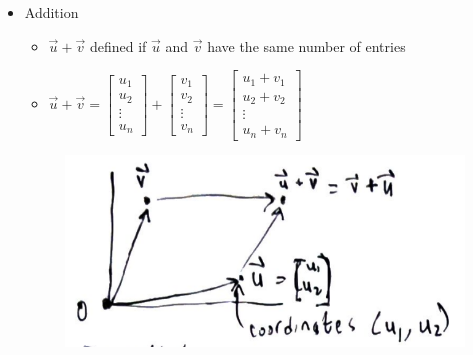 \documentclass[a4paper,12pt]{article}
\theoremstyle{definition}
\theoremstyle{definition}
\begin{document}
	\begin{itemize}
		\item Addition
		\begin{itemize}
			\item $\vec{u} + \vec{v}$ defined if $\vec{u}$ and $\vec{v}$ have the same number of entries
			
			\item $\vec{u} + \vec{v} =
			\begin{bmatrix}
				u_1\\
				u_2\\
				\vdots\\
				u_n
			\end{bmatrix}
			+
			\begin{bmatrix}
				v_1\\
				v_2\\
				\vdots\\
				v_n
			\end{bmatrix}
			=
			\begin{bmatrix}
				u_1 + v_1\\
				u_2 + v_2\\
				\vdots\\
				u_n + v_n
			\end{bmatrix}$
		\end{itemize}
		\begin{figure}[h!]
			\includegraphics[width=0.5\paperwidth, center]{images/vector-addition.PNG}
		\end{figure}
	

\end{itemize}
\end{document}
